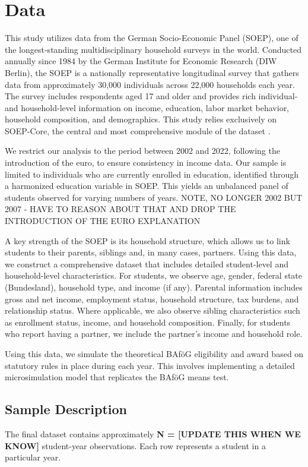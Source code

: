\section{Data}

This study utilizes data from the German Socio-Economic Panel (SOEP), one of the longest-standing multidisciplinary household surveys in the world. Conducted annually since 1984 by the German Institute for Economic Research (DIW Berlin), the SOEP is a nationally representative longitudinal survey that gathers data from approximately 30,000 individuals across 22,000 households each year. The survey includes respondents aged 17 and older and provides rich individual- and household-level information on income, education, labor market behavior, household composition, and demographics. This study relies exclusively on SOEP-Core, the central and most comprehensive module of the dataset \citep{berlin_diw_nodate}.

We restrict our analysis to the period between 2002 and 2022, following the introduction of the euro, to ensure consistency in income data. Our sample is limited to individuals who are currently enrolled in education, identified through a harmonized education variable in SOEP. This yields an unbalanced panel of students observed for varying numbers of years.
NOTE, NO LONGER 2002 BUT 2007 - HAVE TO REASON ABOUT THAT AND DROP THE INTRODUCTION OF THE EURO EXPLANATION

A key strength of the SOEP is its household structure, which allows us to link students to their parents, siblings and, in many cases, partners.
Using this data, we construct a comprehensive dataset that includes detailed student-level and household-level characteristics. For students, we observe age, gender, federal state (Bundesland), household type, and income (if any). Parental information includes gross and net income, employment status, household structure, tax burdens, and relationship status. Where applicable, we also observe sibling characteristics such as enrollment status, income, and household composition. Finally, for students who report having a partner, we include the partner’s income and household role.

Using this data, we simulate the theoretical BAföG eligibility and award based on statutory rules in place during each year. This involves implementing a detailed microsimulation model that replicates the BAföG means test.

\subsection{Sample Description}
The final dataset contains approximately \textbf{N = [UPDATE THIS WHEN WE KNOW]} student-year observations. Each row represents a student in a particular year.

